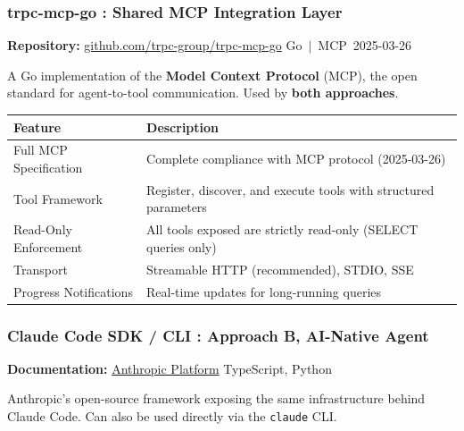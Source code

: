 \documentclass[11pt,a4paper]{article}
\begin{document}
\subsubsection{trpc-mcp-go : Shared MCP Integration Layer}

\textbf{Repository:} \href{https://github.com/trpc-group/trpc-mcp-go}{github.com/trpc-group/trpc-mcp-go} \hfill Go $\,|\,$ MCP~2025-03-26

\vspace{0.3em}
A Go implementation of the \textbf{Model Context Protocol} (MCP), the open standard for agent-to-tool communication. Used by \textbf{both approaches}.

\begin{table}[H]
\centering\small
\begin{tabularx}{0.94\textwidth}{@{}l X@{}}
\toprule
\textbf{Feature} & \textbf{Description} \\
\midrule
Full MCP Specification    & Complete compliance with MCP protocol (2025-03-26) \\
Tool Framework            & Register, discover, and execute tools with structured parameters \\
Read-Only Enforcement     & All tools exposed are strictly read-only (SELECT queries only) \\
Transport                 & Streamable HTTP (recommended), STDIO, SSE \\
Progress Notifications    & Real-time updates for long-running queries \\
\bottomrule
\end{tabularx}
\end{table}

\subsubsection{Claude Code SDK / CLI : Approach B, AI-Native Agent}

\textbf{Documentation:} \href{https://docs.anthropic.com/en/docs/agents-and-tools/claude-agent-sdk}{Anthropic Platform} \hfill TypeScript, Python

\vspace{0.3em}
Anthropic's open-source framework exposing the same infrastructure behind Claude Code. Can also be used directly via the \texttt{claude} CLI.
\end{document}
